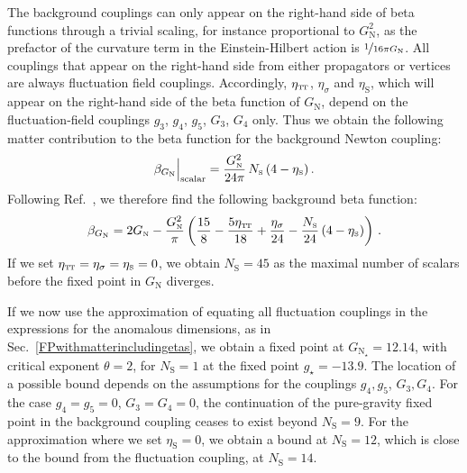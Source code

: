 \documentclass[11pt]{book} %
\newcommand\TTspace{ -1pt }
\newcommand\etaTT{ \eta_{\scriptscriptstyle{\mathrm{T\hspace{\TTspace}T}}} }
\newcommand\etaS{ \eta_{\scriptscriptstyle{\mathrm{S}}} }
\newcommand\NS{ N_{\scriptscriptstyle{\mathrm{S}}} }
\newcommand\GNewton{ G_{\scriptscriptstyle{\mathrm{N}}} }
\newcommand\Gback{ \GNewton } %
\numberwithin{equation}{chapter}
\begin{document}
The background couplings can only appear on the right-hand side of beta functions through a trivial scaling,
for instance proportional to $\Gback^2$, as the prefactor of the curvature term in the Einstein-Hilbert
action is $\nicefrac{1}{16 \pi \Gback}$.
All couplings that appear on the right-hand side from either propagators or vertices are always
fluctuation field couplings.
Accordingly, $\etaTT$, $\eta_{\sigma}$ and $\etaS$,
which will appear on the right-hand side of the beta function of $\Gback$,
depend on the fluctuation-field couplings $g_3$, $g_4$, $g_5$, $G_3$, $G_4$ only.
Thus we obtain the following matter contribution to the beta function for the background Newton coupling:
\begin{align}
  \beta_{\Gback} \Big|_{\rm scalar} = \frac{\Gback^2}{24 \pi} \, \NS \, (4-\etaS) \,.
\end{align}
Following Ref.~\cite{Percacci:2015wwa}, we therefore find the following background beta function:
\begin{align}
  \beta_{\Gback} = 2 \Gback
    - \frac{\Gback^2}{\pi}
  \left(
      \frac{15}{8}
    - \frac{5\etaTT}{18}
    + \frac{\eta_{\sigma}}{24}
    -  \frac{\NS}{24} \, (4 - \etaS)
  \right) \,.
\end{align}
If we set $\etaTT = \eta_{\sigma} = \etaS = 0$, we obtain $\NS=45$ as the maximal
number of scalars before the fixed point in $\Gback$ diverges.

If we now use the approximation of equating all fluctuation couplings in the expressions
for the anomalous dimensions, as in Sec.~\ref{FPwithmatterincludingetas},
we obtain a fixed point at $\Gback_{\star}=12.14$, with critical exponent $\theta=2$,
for $\NS=1$ at the fixed point $g_{\star}=-13.9$.
The location of a possible bound depends on the assumptions for the couplings $g_4, g_5$, $G_3, G_4$.
For the case $g_4 = g_5 = 0$, $G_3 = G_4 = 0$,
the continuation of the pure-gravity fixed point in the background coupling ceases to exist beyond $\NS=9$.
For the approximation where we set $\etaS = 0$, we obtain a bound at $\NS=12$,
which is close to the bound from the fluctuation coupling, at $\NS=14$.
\end{document}
